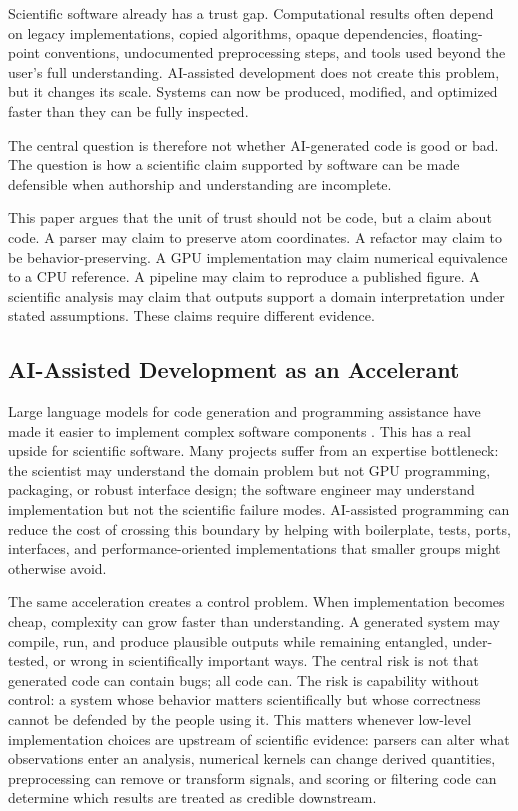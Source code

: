 \documentclass[10pt,twoside]{article}
\begin{document}
Scientific software already has a trust gap. Computational results often
depend on legacy implementations, copied algorithms, opaque dependencies,
floating-point conventions, undocumented preprocessing steps, and tools used
beyond the user's full understanding. AI-assisted development does not create
this problem, but it changes its scale. Systems can now be produced, modified,
and optimized faster than they can be fully inspected.

The central question is therefore not whether AI-generated code is good or bad.
The question is how a scientific claim supported by software can be made
defensible when authorship and understanding are incomplete.

This paper argues that the unit of trust should not be code, but a claim about
code. A parser may claim to preserve atom coordinates. A refactor may claim to
be behavior-preserving. A GPU implementation may claim numerical equivalence to
a CPU reference. A pipeline may claim to reproduce a published figure. A
scientific analysis may claim that outputs support a domain interpretation
under stated assumptions. These claims require different evidence.

\subsection{AI-Assisted Development as an Accelerant}

Large language models for code generation and programming assistance have made
it easier to implement complex software components \citep{chen_evaluating_2021,
peng_impact_2023}. This has a real upside for scientific software. Many
projects suffer from an expertise bottleneck: the scientist may understand the
domain problem but not GPU programming, packaging, or robust interface design;
the software engineer may understand implementation but not the scientific
failure modes. AI-assisted programming can reduce the cost of crossing this
boundary by helping with boilerplate, tests, ports, interfaces, and
performance-oriented implementations that smaller groups might otherwise avoid.

The same acceleration creates a control problem. When implementation becomes
cheap, complexity can grow faster than understanding. A generated system may
compile, run, and produce plausible outputs while remaining entangled,
under-tested, or wrong in scientifically important ways. The central risk is
not that generated code can contain bugs; all code can. The risk is capability
without control: a system whose behavior matters scientifically but whose
correctness cannot be defended by the people using it. This matters whenever
low-level implementation choices are upstream of scientific evidence: parsers
can alter what observations enter an analysis, numerical kernels can change
derived quantities, preprocessing can remove or transform signals, and scoring
or filtering code can determine which results are treated as credible
downstream.
\end{document}
